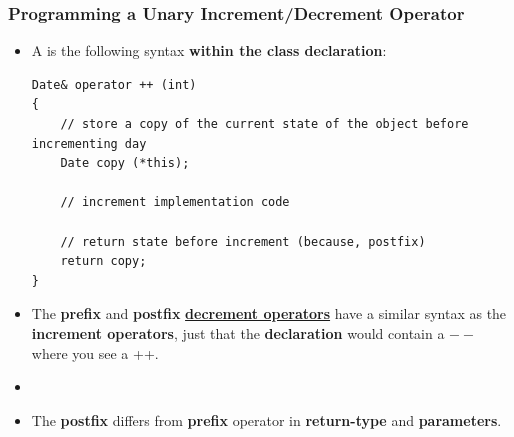 \documentclass[10pt]{article}
\begin{document}
\newpage
\subsubsection{Programming a Unary Increment/Decrement Operator}
\begin{itemize}
	\item A  is the following syntax \textbf{within the class declaration}:
		\begin{verbatim}
Date& operator ++ (int)
{
	// store a copy of the current state of the object before incrementing day
	Date copy (*this);

	// increment implementation code

	// return state before increment (because, postfix)
	return copy;
}
		\end{verbatim}

	\item The \textbf{prefix} and \textbf{postfix} \underline{\textbf{decrement operators}} have a similar syntax as the \textbf{increment operators}, just that the \textbf{declaration} would contain a $--$ where you see a ++.

	\item {}

	\item The \textbf{postfix} differs from \textbf{prefix} operator in \textbf{return-type} and \textbf{parameters}.
\end{itemize}

\newpage
\end{document}
